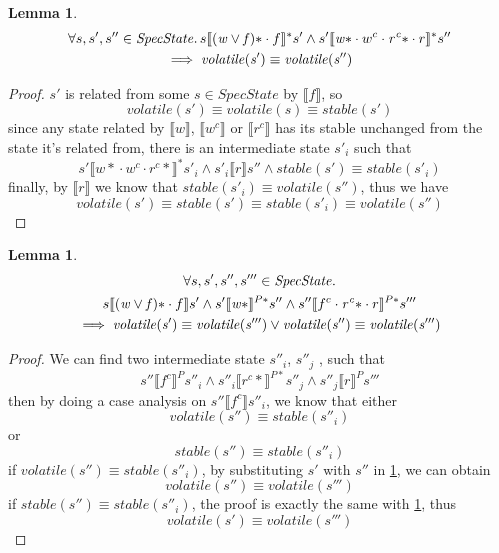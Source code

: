 \documentclass[letterpaper,twocolumn,10pt]{article}
\newtheorem{lemma}[theorem]{Lemma}
\theoremstyle{definition}
\renewcommand{\i}[1]{\ensuremath{\mathit{#1}}}
\begin{document}
\begin{lemma}\label{lemma-2-1}
\begin{multline*}
	\forall s, s', s'' \in \i{SpecState} \ldotp s \llbracket \i{(w \lor f)\ast} \cdot f \rrbracket^* s' \land s' \llbracket \i{w\ast} \cdot w^c \cdot \i{r^c\ast} \cdot r \rrbracket^* s'' \\
	  \implies \i{volatile(s')} \equiv \i{volatile(s'')}
\end{multline*}
\end{lemma}
\begin{proof}
	$s'$ is related from some $s \in \i{SpecState}$ by $\llbracket f \rrbracket$, so
		$$\i{volatile(s')} \equiv \i{volatile(s)} \equiv \i{stable(s')}$$
	since any state related by $\llbracket w \rrbracket$, $\llbracket w^c \rrbracket$ or $\llbracket r^c \rrbracket$ has its stable unchanged from the state it's related from, there is an intermediate state $s'_i$ such that
		$$s' \llbracket {w*} \cdot w^c \cdot {r^c *} \rrbracket^* s'_i \land s'_i \llbracket r \rrbracket s'' \land stable(s') \equiv stable(s'_i)$$
	finally, by $\llbracket r \rrbracket$ we know that $\i{stable(s'_i) \equiv volatile(s'')}$, thus we have
		$$\i{volatile(s') \equiv stable(s') \equiv stable(s'_i) \equiv volatile(s'')}$$
\end{proof}

\begin{lemma}\label{lemma-2-2}
\begin{multline*}
      \forall s, s', s'', s''' \in \i{SpecState} \ldotp \\
      s \llbracket \i{(w \lor f)\ast} \cdot f \rrbracket s' \land
	  s' \llbracket \i{w\ast} \rrbracket^{P*} s'' \land
	  s'' \llbracket f^c \cdot \i{r^c\ast} \cdot r \rrbracket^{P*} s'''\\ \implies \i{volatile(s')} \equiv \i{volatile(s''')} \lor \i{volatile(s'')} \equiv \i{volatile(s''')}
\end{multline*}
\end{lemma}
\begin{proof}
	We can find two intermediate state $s''_i$, $s''_j$ , such that $$s'' \llbracket f^c \rrbracket^P s''_i \land s''_i \llbracket r^c* \rrbracket^{P*} s''_j \land s''_j \llbracket r \rrbracket^P s'''$$
	then by doing a case analysis on $s'' \llbracket f^c \rrbracket s''_i$, we know that either $$\i{volatile(s'') \equiv stable(s''_i)}$$ or $$\i{stable(s'') \equiv stable(s''_i)}$$
	if $\i{volatile(s'') \equiv stable(s''_i)}$, by substituting $s'$ with $s''$ in
	\cref{lemma-2-1}, we can obtain $$\i{volatile(s'') \equiv volatile(s''')}$$
	if $\i{stable(s'') \equiv stable(s''_i)}$, the proof is exactly the same with \cref{lemma-2-1}, thus $$\i{volatile(s') \equiv volatile(s''')}$$
\end{proof}
\end{document}
